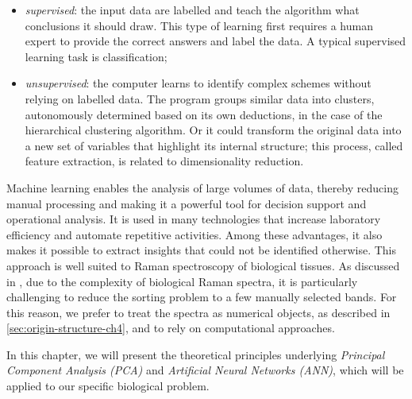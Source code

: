 \begin{itemize}
    \item \textit{supervised}: the input data are labelled and teach the algorithm what conclusions it should draw. This type of learning first requires a human expert to provide the correct answers and label the data. 
A typical supervised learning task is classification;    

       \item \textit{unsupervised}: the computer learns to identify complex schemes without relying on labelled data. The program groups similar data into clusters, autonomously determined based on its own deductions, in the case of the hierarchical clustering algorithm. Or it could transform the original data into a new set of variables that highlight its internal structure; this process, called feature extraction, is related to dimensionality reduction.
       
\end{itemize}


Machine learning enables the analysis of large volumes of data, thereby reducing manual processing and making it a powerful tool for decision support and operational analysis. It is used in many technologies that increase laboratory efficiency and automate repetitive activities. Among these advantages, it also makes it possible to extract insights that could not be identified otherwise.
This approach is well suited to Raman spectroscopy of biological tissues. As discussed in , due to the complexity of biological Raman spectra, it is particularly challenging to reduce the sorting problem to a few manually selected bands. For this reason, we prefer to treat the spectra as numerical objects, as described in \cref{sec:origin-structure-ch4}, and to rely on computational approaches.

In this chapter, we will present the theoretical principles underlying \textit{Principal Component Analysis (PCA)} and \textit{Artificial Neural Networks (ANN)}, which will be applied to our specific biological problem.



